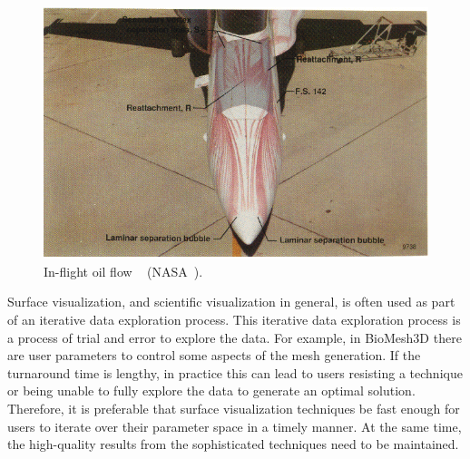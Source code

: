 \begin{figure}[!t]
	\begin{center}
		\includegraphics[width=5.0in]{images/f-18_inflight_oil_flow2}
	\end{center}
	\caption{In-flight oil flow ~\cite{inflightflowvis} (NASA~\cite{inflightflowvis}).}
	\label{fig:oilseparation}
\end{figure}

Surface visualization, and scientific visualization in general, is often used as part of an iterative data exploration process. This iterative data exploration process is a process of trial and error to explore the data. For example, in BioMesh3D there are user parameters to control some aspects of the mesh generation. If the turnaround time is lengthy, in practice this can lead to users resisting a technique or being unable to fully explore the data to generate an optimal solution. Therefore, it is preferable that surface visualization techniques be fast enough for users to iterate over their parameter space in a timely manner. At the same time, the high-quality results from the sophisticated techniques need to be maintained.

